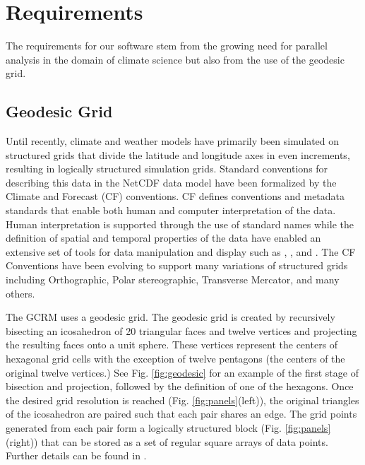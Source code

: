 \section{Requirements}
\label{section:requirements}

The requirements for our software stem from the growing need for parallel
analysis in the domain of climate science\cite{MODSIM07:LOT} but also from
the use of the geodesic grid.

\subsection{Geodesic Grid}
\label{subsection:grid}

Until recently, climate and weather models have primarily been simulated on
structured grids that divide the latitude and longitude axes in even
increments, resulting in logically structured simulation grids.  Standard
conventions for describing this data in the NetCDF data model have been
formalized by the Climate and Forecast (CF) conventions\cite{CF}.  CF defines
conventions and metadata standards that enable both human and computer
interpretation of the data.  Human interpretation is supported through the use
of standard names while the definition of spatial and temporal properties of the
data have enabled an extensive set of tools for data manipulation and display
such as \cite{NCO}, \cite{OPeNDAP}, and \cite{FERRET}.  The CF Conventions
have been evolving to support many variations of structured grids including
Orthographic, Polar stereographic, Transverse Mercator, and many others. 

The GCRM uses a geodesic grid.  The geodesic grid is created by recursively
bisecting an icosahedron of 20 triangular faces and twelve vertices and
projecting the resulting faces onto a unit sphere.  These vertices
represent the centers of hexagonal grid cells with the exception of twelve
pentagons (the centers of the original twelve vertices.) See Fig.
\ref{fig:geodesic} for an example of the first stage of bisection and
projection, followed by the definition of one of the hexagons.  Once the
desired grid resolution is reached (Fig. \ref{fig:panels}(left)), the
original triangles of the icosahedron are paired such that each pair shares an
edge. The grid points generated from each pair form a logically
structured block (Fig. \ref{fig:panels}(right)) that can be stored
as a set of regular square arrays of data points.  Further details can be
found in \cite{GEODESIC}.

